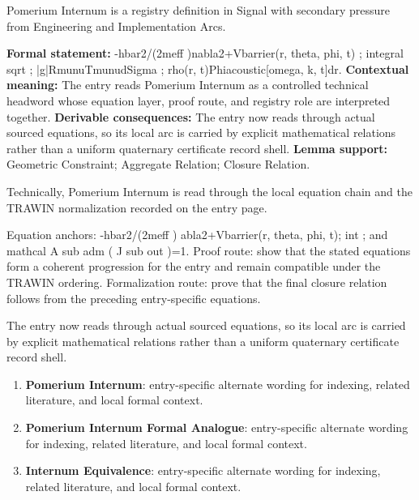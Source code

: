 
\begingroup\small
{}
Pomerium Internum is a registry definition in Signal with secondary pressure from Engineering and Implementation Arcs.

\begingroup\footnotesize\setlength{\emergencystretch}{3em}\sloppy
\textbf{Formal statement:} -hbar2/(2meff )nabla2+Vbarrier(r, theta, phi, t) ; integral sqrt ; |g|RmunuTmunudSigma ; rho(r, t)Phiacoustic[omega, k, t]dr. \textbf{Contextual meaning:} The entry reads Pomerium Internum as a controlled technical headword whose equation layer, proof route, and registry role are interpreted together. \textbf{Derivable consequences:} The entry now reads through actual sourced equations, so its local arc is carried by explicit mathematical relations rather than a uniform quaternary certificate record shell. \textbf{Lemma support:} Geometric Constraint; Aggregate Relation; Closure Relation.\par
\endgroup

Technically, Pomerium Internum is read through the local equation chain and the TRAWIN normalization recorded on the entry page.

Equation anchors: -hbar2/(2meff ) abla2+Vbarrier(r, theta, phi, t); int  ; and mathcal A sub adm ( J sub out )=1. Proof route: show that the stated equations form a coherent progression for the entry and remain compatible under the TRAWIN ordering. Formalization route: prove that the final closure relation follows from the preceding entry-specific equations.

The entry now reads through actual sourced equations, so its local arc is carried by explicit mathematical relations rather than a uniform quaternary certificate record shell.
\endgroup

\begin{enumerate}[leftmargin=1.6em,itemsep=6pt,topsep=4pt]
\item \textbf{Pomerium Internum}: entry-specific alternate wording for indexing, related literature, and local formal context.
\item \textbf{Pomerium Internum Formal Analogue}: entry-specific alternate wording for indexing, related literature, and local formal context.
\item \textbf{Internum Equivalence}: entry-specific alternate wording for indexing, related literature, and local formal context.
\end{enumerate}

